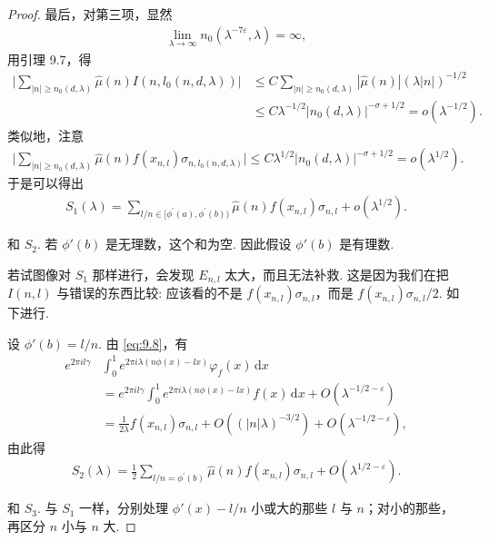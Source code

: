 \begin{proof}
最后，对第三项，显然
\begin{align*}
  \lim_{\lambda\to\infty}n_{0}(\lambda^{-7\varepsilon},\lambda)=\infty,
\end{align*}
用引理 9.7，得
\begin{align*}
  \Big|\sum_{|n|\geq n_{0}(d,\lambda)}\hat{\mu}(n)I(n,l_{0}(n,d,\lambda))\Big|
  &\leq C\sum_{|n|\geq n_{0}(d,\lambda)}|\hat{\mu}(n)|(\lambda|n|)^{-1/2}\\
  &\leq C\lambda^{-1/2}|n_{0}(d,\lambda)|^{-\sigma+1/2}=o(\lambda^{-1/2}).
\end{align*}
类似地，注意
\begin{align*}
  \Big|\sum_{|n|\geq n_{0}(d,\lambda)}\widehat{\mu}(n)f(x_{n,l})\sigma_{n,l_{0}(n,d,\lambda)}\Big|
  \leq C\lambda^{1/2}|n_{0}(d,\lambda)|^{-\sigma+1/2}=o(\lambda^{1/2}).
\end{align*}
于是可以得出
\begin{align*}
  S_{1}(\lambda)=\sum_{l/n\in[\phi^{\prime}(a),\phi^{\prime}(b))}\hat{\mu}(n)f(x_{n,l})\sigma_{n,l}+o(\lambda^{1/2}).
\end{align*}

和 $S_2$. 若 $\phi'(b)$ 是无理数，这个和为空. 因此假设 $\phi'(b)$ 是有理数.

若试图像对 $S_{1}$ 那样进行，会发现 $E_{n,l}$ 太大，而且无法补救. 这是因为我们在把 $I(n,l)$ 与错误的东西比较: 应该看的不是 $f(x_{n,l})\sigma_{n,l}$，而是 $f(x_{n,l})\sigma_{n,l}/2$. 如下进行.

设 $\phi'(b) = l/n$. 由 \eqref{eq:9.8}，有
\begin{align*}
  e^{2\pi i l\gamma}&\int_{0}^{1}e^{2\pi i\lambda(n\phi(x)-lx)}\varphi_{f}(x)\,\mathrm{d}x\\
  &=e^{2\pi i l\gamma}\int_{0}^{1}e^{2\pi i\lambda(n\phi(x)-lx)}f(x)\,\mathrm{d}x+O(\lambda^{-1/2-\varepsilon})\\
  &=\frac{1}{2\lambda}f(x_{n,l})\sigma_{n,l}+O((|n|\lambda)^{-3/2})+O(\lambda^{-1/2-\varepsilon}),
\end{align*}
由此得
\begin{align*}
  S_{2}(\lambda)=\frac{1}{2}\sum_{l/n=\phi^{\prime}(b)}\hat{\mu}(n)f(x_{n,l})\sigma_{n,l}
  +O(\lambda^{1/2-\varepsilon}).
\end{align*}

和 $S_3$. 与 $S_1$ 一样，分别处理 $\phi'(x) - l/n$ 小或大的那些 $l$ 与 $n$；对小的那些，再区分 $n$ 小与 $n$ 大.


\end{proof}
